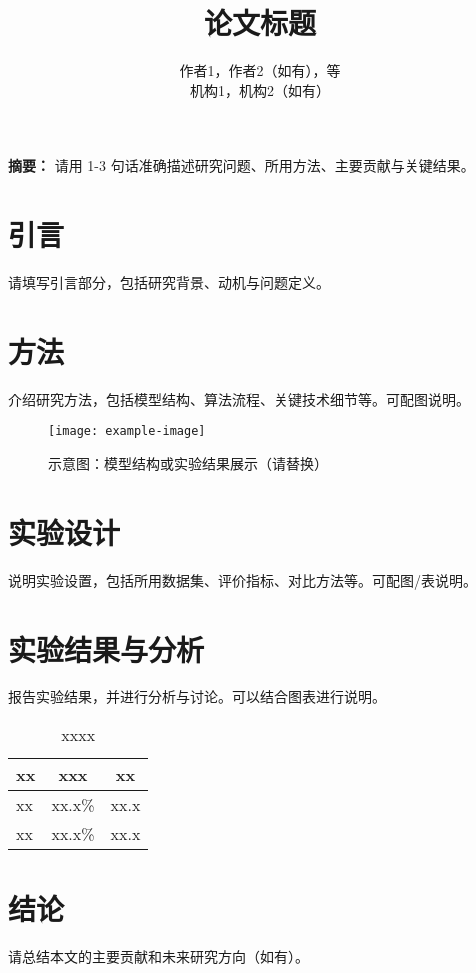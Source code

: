 \documentclass[10pt,twocolumn]{article}
\title{\textbf{论文标题}}  %
\author{
    作者1，作者2（如有），等\\   %
    机构1，机构2（如有）        %
}
\begin{document}
\maketitle

\noindent \textbf{摘要：} 请用 1-3 句话准确描述研究问题、所用方法、主要贡献与关键结果。

\vspace{0.5em}

\section{引言}
请填写引言部分，包括研究背景、动机与问题定义。

\section{方法}
介绍研究方法，包括模型结构、算法流程、关键技术细节等。可配图说明。
\begin{figure}[h]
    \centering
    \texttt{[image: example-image]}
    \caption{示意图：模型结构或实验结果展示（请替换）}
\end{figure}

\section{实验设计}
说明实验设置，包括所用数据集、评价指标、对比方法等。可配图/表说明。

\section{实验结果与分析}
报告实验结果，并进行分析与讨论。可以结合图表进行说明。

\begin{table}[h]
\centering
\caption{xxxx}
\begin{tabular}{lcc}
\hline
xx & xxx & xx \\
\hline
xx & xx.x\% & xx.x \\
xx & xx.x\% & xx.x \\
\hline
\end{tabular}
\end{table}

\section{结论}
请总结本文的主要贡献和未来研究方向（如有）。
\end{document}
